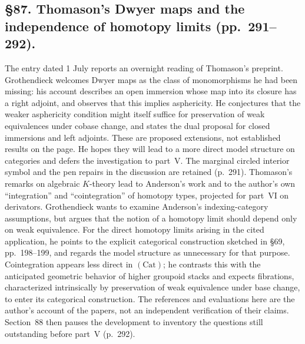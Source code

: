 \documentclass[10pt,oneside]{book}
\begin{document}
\subsection*{\S87. Thomason's Dwyer maps and the independence of homotopy limits (pp.\ 291--292).}
The entry dated 1 July reports an overnight reading of Thomason's preprint. Grothendieck welcomes Dwyer maps as the class of monomorphisms he had been missing: his account describes an open immersion whose map into its closure has a right adjoint, and observes that this implies asphericity. He conjectures that the weaker asphericity condition might itself suffice for preservation of weak equivalences under cobase change, and states the dual proposal for closed immersions and left adjoints. These are proposed extensions, not established results on the page. He hopes they will lead to a more direct model structure on categories and defers the investigation to part~V. The marginal circled interior symbol and the pen repairs in the discussion are retained (p.\ 291). Thomason's remarks on algebraic $K$-theory lead to Anderson's work and to the author's own “integration” and “cointegration” of homotopy types, projected for part~VI on derivators. Grothendieck wants to examine Anderson's indexing-category assumptions, but argues that the notion of a homotopy limit should depend only on weak equivalence. For the direct homotopy limits arising in the cited application, he points to the explicit categorical construction sketched in \S69, pp.\ 198--199, and regards the model structure as unnecessary for that purpose. Cointegration appears less direct in $(\mathrm{Cat})$; he contrasts this with the anticipated geometric behavior of higher groupoid stacks and expects fibrations, characterized intrinsically by preservation of weak equivalence under base change, to enter its categorical construction. The references and evaluations here are the author's account of the papers, not an independent verification of their claims. Section~88 then pauses the development to inventory the questions still outstanding before part~V (p.\ 292).
\end{document}
